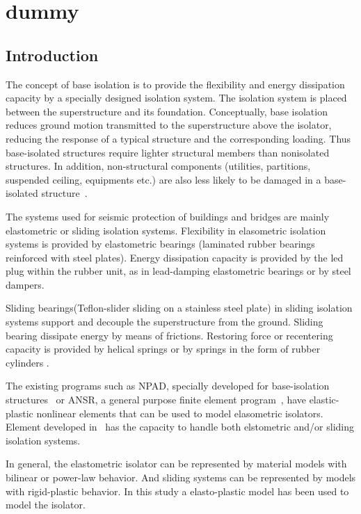 \chapter{dummy}
\section{Introduction}
The concept of base isolation is to provide the flexibility and
energy dissipation capacity by
a specially designed isolation system. The isolation system
is placed between the superstructure and
its foundation. Conceptually, base isolation reduces ground motion
transmitted to the superstructure above the
isolator, reducing the response of a typical structure
and the corresponding loading. Thus base-isolated
structures require lighter structural members than
nonisolated structures. In addition, non-structural
components (utilities, partitions, suspended ceiling,
equipments etc.) are also less likely to be damaged
in a base-isolated structure~\cite{ferritto}.

The systems used for seismic protection of buildings
and bridges are mainly elastometric
or sliding isolation systems. Flexibility in elasometric isolation
systems is provided by elastometric bearings
(laminated rubber bearings reinforced with steel plates).
Energy dissipation capacity is provided
by the led plug within the rubber unit,
as in lead-damping elastometric bearings or by steel dampers.


Sliding bearings(Teflon-slider sliding on a stainless steel
plate) in sliding isolation systems support and
decouple the superstructure from the ground. Sliding
bearing dissipate energy by means of frictions. Restoring
force or recentering capacity is provided by helical springs
or by springs in the form of rubber cylinders
\cite{nagarajaiah}.


The existing programs such as NPAD, specially developed for
base-isolation structures~\cite{way-jeng}
or ANSR, a general purpose finite element program~\cite{mondkar},
have elastic-plastic nonlinear elements that
can be used to model elasometric isolators.
Element developed in~\cite{nagarajaiah} has the capacity to handle both
elstometric and/or sliding isolation systems.

In general, the elastometric isolator can be represented by
material models with bilinear or power-law behavior. And
sliding systems can be represented by models with rigid-plastic behavior.
In this study a elasto-plastic model has been used to model the isolator.





